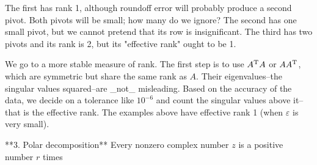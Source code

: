 The first has rank 1, although roundoff error will probably produce a second pivot. Both pivots will be small; how many do we ignore? The second has one small pivot, but we cannot pretend that its row is insignificant. The third has two pivots and its rank is 2, but its "effective rank" ought to be 1.

We go to a more stable measure of rank. The first step is to use \(A^{\rm T}A\) or \(AA^{\rm T}\), which are symmetric but share the same rank as \(A\). Their eigenvalues--the singular values squared--are _not_ misleading. Based on the accuracy of the data, we decide on a tolerance like \(10^{-6}\) and count the singular values above it--that is the effective rank. The examples above have effective rank 1 (when \(\varepsilon\) is very small).

**3. Polar decomposition** Every nonzero complex number \(z\) is a positive number \(r\) times 